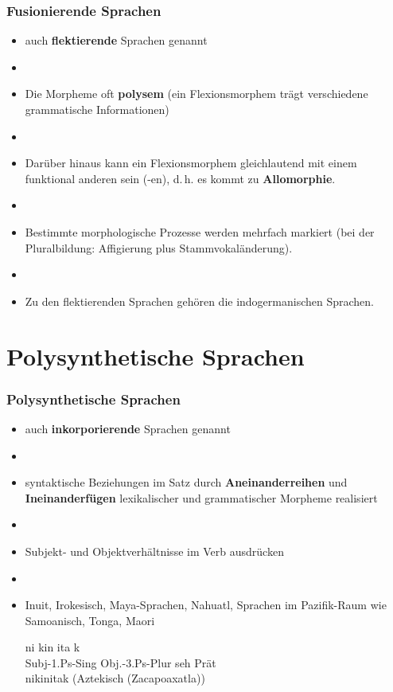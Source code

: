 \begin{frame}
\frametitle{Fusionierende Sprachen}

\begin{itemize}
	\item auch \textbf{flektierende} Sprachen genannt
	\item[]
	\item Die Morpheme oft \textbf{polysem} (ein Flexionsmorphem trägt verschiedene grammatische Informationen)
	\item[]
	\item Darüber hinaus kann ein Flexionsmorphem gleichlautend mit einem funktional anderen sein (\zB -en), d.\,h. es kommt zu \textbf{Allomorphie}.
	\item[]
	\item Bestimmte morphologische Prozesse werden mehrfach markiert (\zB bei der Pluralbildung: Affigierung plus Stammvokaländerung).
	\item[]
	\item Zu den flektierenden Sprachen gehören die indogermanischen Sprachen.
\end{itemize}


\end{frame}


\section{Polysynthetische Sprachen}


\begin{frame}
\frametitle{Polysynthetische Sprachen}

\begin{itemize}
	\item auch \textbf{inkorporierende} Sprachen genannt
	\item[]
	\item syntaktische Beziehungen im Satz durch \textbf{Aneinanderreihen} und \textbf{Ineinanderfügen} lexikalischer und grammatischer Morpheme realisiert
	\item[]
	\item \zB Subjekt- und Objektverhältnisse im Verb ausdrücken
	\item[]
	\item Inuit, Irokesisch, Maya-Sprachen, Nahuatl, Sprachen im Pazifik-Raum wie Samoanisch, Tonga, Maori
	
	\ea
	\glll	ni kin ita k \\
			{Subj-1.Ps-Sing} {Obj.-3.Ps-Plur} seh Prät \\
			{nikinitak (Aztekisch (Zacapoaxatla))} \\
	\z
	
\end{itemize}


\end{frame}


